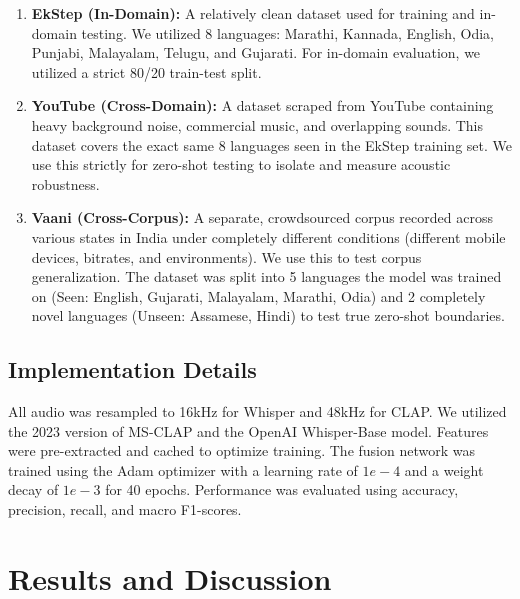 \documentclass[conference]{IEEEtran}
\begin{document}
\begin{enumerate}
    \item \textbf{EkStep (In-Domain):} A relatively clean dataset used for training and in-domain testing. We utilized 8 languages: Marathi, Kannada, English, Odia, Punjabi, Malayalam, Telugu, and Gujarati. For in-domain evaluation, we utilized a strict 80/20 train-test split.
    
    \item \textbf{YouTube (Cross-Domain):} A dataset scraped from YouTube containing heavy background noise, commercial music, and overlapping sounds. This dataset covers the exact same 8 languages seen in the EkStep training set. We use this strictly for zero-shot testing to isolate and measure acoustic robustness.
    
    \item \textbf{Vaani (Cross-Corpus):} A separate, crowdsourced corpus recorded across various states in India under completely different conditions (different mobile devices, bitrates, and environments). We use this to test corpus generalization. The dataset was split into 5 languages the model was trained on (Seen: English, Gujarati, Malayalam, Marathi, Odia) and 2 completely novel languages (Unseen: Assamese, Hindi) to test true zero-shot boundaries.
\end{enumerate}

\subsection{Implementation Details}
All audio was resampled to 16kHz for Whisper and 48kHz for CLAP. We utilized the 2023 version of MS-CLAP and the OpenAI Whisper-Base model. Features were pre-extracted and cached to optimize training. The fusion network was trained using the Adam optimizer with a learning rate of $1e-4$ and a weight decay of $1e-3$ for 40 epochs. Performance was evaluated using accuracy, precision, recall, and macro F1-scores.

\section{Results and Discussion}
\end{document}
